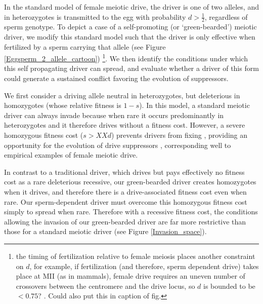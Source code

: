 \documentclass[12pt,letterpaper]{article}
\begin{document}
In the standard model of female meiotic drive, the driver is one of two alleles, and in heterozygotes is transmitted to the egg with probability  $d > \frac{1}{2}$, regardless of sperm genotype. 
To depict a case of a self-promoting (or `green-bearded') meiotic
driver,  we modify this standard model such that the driver is only effective when fertilized by a sperm carrying that allele (see Figure
\ref{Eggsperm_2_allele_cartoon}) \footnote{the timing of fertilization relative to female meiosis places another constraint on $d$, for example, if fertilization (and therefore, sperm dependent drive) takes place at MII (as in mammals),
	female drive requires an uneven number of crossovers between the centromere and the drive locus, 
	so $d$ is bounded to be $<0.75$? \citep[see ][ for discussion]{Buckler1999}. Could also put this in
        caption of fig.}.
We then identify the conditions under which this self propagating driver can spread, and evaluate whether a driver of this form could generate a sustained conflict favoring the evolution of suppressors. 



We first consider a driving allele neutral in heterozygotes, 
	but deleterious in homozygotes (whose relative fitness is $1-s$).  
In this model, a standard meiotic driver can always invade because 
	when rare it occurs predominantly in heterozygotes and it therefore drives without a fitness cost. 
However, a severe homozygous fitness cost ($s>XXd$) prevents  
	drivers from fixing  \citep{Prout1973}, 
	providing an opportunity for the evolution of
	drive suppressors \citep{XX}, corresponding well to 
	empirical examples of female meiotic drive. 



In contrast to a traditional driver, which drives but pays effectively
no fitness cost as a rare deleterious recessive, 
	our green-bearded driver creates homozygotes
        when it drives, and therefore there is a drive-associated fitness cost even when rare. 
Our sperm-dependent driver must overcome this homozygous fitness cost simply to spread when rare.
Therefore with a recessive fitness cost,
	the conditions allowing the invasion of our green-bearded driver 
 	are far more restrictive than those for a standard meiotic driver (see Figure \ref{Invasion_space}).

\end{document}
